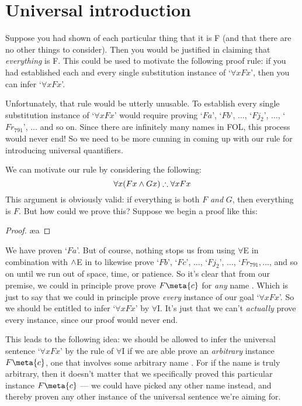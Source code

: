 \section{Universal introduction}
Suppose you had shown of each particular thing that it is F (and that there are no other things to consider). Then you would be justified in claiming that \emph{everything} is F. This could be used to motivate the following proof rule: if you had established each and every single substitution instance of `$\forall x Fx$', then you can infer `$\forall x Fx$'. 

Unfortunately, that rule would be utterly unusable. To establish every single substitution instance of `$\forall x Fx$' would require proving `$Fa$', `$Fb$', $\ldots$, `$Fj_2$', $\ldots$, `$Fr_{791}$', $\ldots$ and so on. Since there are infinitely many names in FOL, this process would never end! So we need to be more cunning in coming up with our rule for introducing universal quantifiers. 

We can motivate our rule by considering the following:
$$\forall x (Fx \wedge Gx) \therefore \forall x Fx$$
This argument is obviously valid: if everything is both $F$ \emph{and} $G$, then everything is $F$.  But how could we prove this?  Suppose we begin a proof like this:
\begin{proof}
	 
	 \ae{a}
\end{proof}
We have proven `$Fa$'.  But of course, nothing stops us from using $\forall$E in combination with $\wedge$E in to likewise prove `$Fb$', `$Fc$', $\ldots$, `$Fj_2$', $\ldots$, `$Fr_{791}, \ldots$, and so on until we run out of space, time, or patience.   So it's clear that from our premise, we could in principle prove 
prove $F\meta{c}$ for \emph{any} name .  Which is just to say that we could in principle prove \emph{every} instance of our goal `$\forall x Fx$'.  So we should be entitled to infer `$\forall x Fx$' by $\forall$I.  It's just that we can't \emph{actually} prove every instance, since our proof would never end.

This leads to the following idea: we should be allowed to infer the universal sentence `$\forall x Fx$' by the rule of $\forall$I if we are able prove an \emph{arbitrary} instance $F\meta{c}$, one that involves some arbitrary name .  For if the name  is truly arbitrary, then it doesn't matter that we specifically proved this particular instance $F\meta{c}$  --- we could have picked any other name instead, and thereby proven any other instance of the universal sentence we're aiming for.

